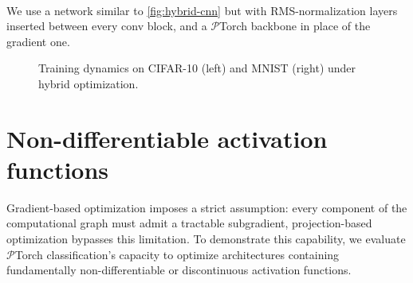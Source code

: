   \begin{tcolorbox}[reprocard, title=Setup]\\
  We use a network similar to \cref{fig:hybrid-cnn} but with RMS-normalization layers inserted between every conv block, and a
  $\mathcal{P}$Torch backbone in place of the gradient one.
  \end{tcolorbox}

  \begin{figure}[ht]
  \centering
  \caption{Training dynamics on CIFAR-10 (left) and MNIST (right) under hybrid optimization.}
  \label{fig:hybrid-optimization}
  \end{figure}
\section{Non-differentiable activation functions}
Gradient-based optimization imposes a strict assumption: every component of the computational graph must admit a tractable subgradient, projection-based optimization  bypasses this limitation. To demonstrate this capability, we evaluate $\mathcal{P}$Torch classification's capacity to optimize architectures containing fundamentally non-differentiable or discontinuous activation functions.

